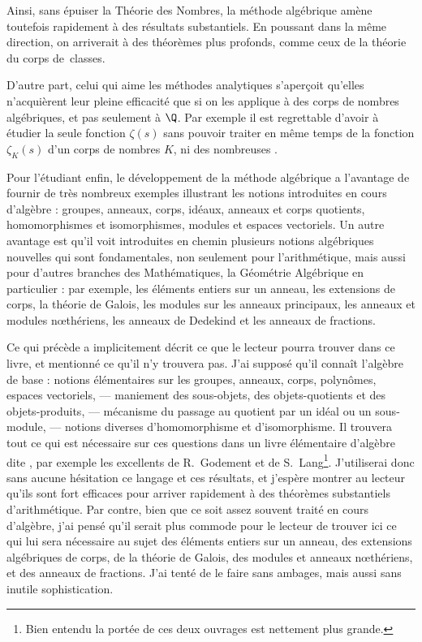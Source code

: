 \documentclass[11pt, %
  title in boldface,
  theorem in new line,
  theorem numbering = section,
  number theorems separately,
  simple name,
]{beaulivre}
\begin{document}
    Ainsi, sans épuiser la Théorie des Nombres, la méthode algébrique amène toutefois rapidement à des résultats substantiels. En poussant dans la même direction, on arriverait à des théorèmes plus profonds, comme ceux de la théorie du corps de~classes.

    D'autre part, celui qui aime les méthodes analytiques s'aperçoit qu'elles n'acquièrent leur pleine efficacité que si on les applique à des corps de nombres algébriques, et pas seulement à \( \Q \). Par exemple il est regrettable d'avoir à étudier la seule fonction \( \zeta(s) \) sans pouvoir traiter en même temps de la fonction \( \zeta_K(s) \) d'un corps de nombres \( K \), ni des nombreuses .

    Pour l'étudiant enfin, le développement de la méthode algébrique a l'avantage de fournir de très nombreux exemples illustrant les notions introduites en cours d'algèbre : groupes, anneaux, corps, idéaux, anneaux et corps quotients, homomorphismes et isomorphismes, modules et espaces vectoriels. Un autre avantage est qu'il voit introduites en chemin plusieurs notions algébriques nouvelles qui sont fondamentales, non seulement pour l'arithmétique, mais aussi pour d'autres branches des Mathématiques, la Géométrie Algébrique en particulier : par exemple, les éléments entiers sur un anneau, les extensions de corps, la théorie de Galois, les modules sur les anneaux principaux, les anneaux et modules nœthériens, les anneaux de Dedekind et les anneaux de fractions.

    Ce qui précède a implicitement décrit ce que le lecteur pourra trouver dans ce livre, et mentionné ce qu'il n'y trouvera pas. J'ai supposé qu'il connaît l'algèbre de base : notions élémentaires sur les groupes, anneaux, corps, polynômes, espaces vectoriels, --- maniement des sous-objets, des objets-quotients et des objets-produits, --- mécanisme du passage au quotient par un idéal ou un sous-module, --- notions diverses d'homomorphisme et d'isomorphisme. Il trouvera tout ce qui est nécessaire sur ces questions dans un livre élémentaire d'algèbre dite , par exemple les excellents  de R.~Godement et  de S.~Lang\footnote{Bien entendu la portée de ces deux ouvrages est nettement plus grande.}. J'utiliserai donc sans aucune hésitation ce langage et ces résultats, et j'espère montrer au lecteur qu'ils sont fort efficaces pour arriver rapidement à des théorèmes substantiels d'arithmétique. Par contre, bien que ce soit assez souvent traité en cours d'algèbre, j'ai pensé qu'il serait plus commode pour le lecteur de trouver ici ce qui lui sera nécessaire au sujet des éléments entiers sur un anneau, des extensions algébriques de corps, de la théorie de Galois, des modules et anneaux nœthériens, et des anneaux de fractions. J'ai tenté de le faire sans ambages, mais aussi sans inutile sophistication.
\end{document}
